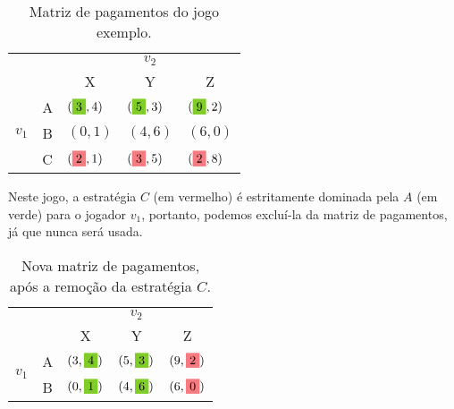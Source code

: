 \begin{table}[h]
\begin{center}
    \begin{tabular}{ccccc}
        & & \multicolumn{3}{c}{$v_2$} \\
        & & X & Y & Z \\ \cline{3-5} 
        \multirow{3}{*}{$v_1$} & \multicolumn{1}{c|}{A} & \multicolumn{1}{l|}{$(\colorbox{LimeGreen}{3},4)$} & \multicolumn{1}{l|}{$(\colorbox{LimeGreen}{5},3)$} & \multicolumn{1}{l|}{$(\colorbox{LimeGreen}{9},2)$} \\ \cline{3-5} 
        & \multicolumn{1}{c|}{B} & \multicolumn{1}{l|}{$(0,1)$}  & \multicolumn{1}{l|}{$(4,6)$} & \multicolumn{1}{l|}{$(6,0)$}  \\ \cline{3-5} 
        & \multicolumn{1}{l|}{C} & \multicolumn{1}{l|}{$(\colorbox{Salmon}{2},1)$}  & \multicolumn{1}{l|}{$(\colorbox{Salmon}{3},5)$} & \multicolumn{1}{l|}{$(\colorbox{Salmon}{2},8)$} \\ \cline{3-5} 
    \end{tabular}
    \caption{Matriz de pagamentos do jogo exemplo.}
    \label{mpjdi1}
\end{center}
\end{table}
Neste jogo, a estratégia $C$ (em vermelho) é estritamente dominada pela $A$ (em verde) para o jogador $v_1$, portanto, podemos excluí-la da matriz de pagamentos, já que nunca será usada.

\begin{table}[h]
\begin{center}
    \begin{tabular}{ccccc}
        & & \multicolumn{3}{c}{$v_2$} \\
        & & X & Y & Z \\ \cline{3-5} 
        \multirow{2}{*}{$v_1$} & \multicolumn{1}{c|}{A} & \multicolumn{1}{l|}{$(3,\colorbox{LimeGreen}{4})$} & \multicolumn{1}{l|}{$(5,\colorbox{LimeGreen}{3})$} & \multicolumn{1}{l|}{$(9,\colorbox{Salmon}{2})$} \\ \cline{3-5} 
        & \multicolumn{1}{c|}{B} & \multicolumn{1}{l|}{$(0,\colorbox{LimeGreen}{1})$}  & \multicolumn{1}{l|}{$(4,\colorbox{LimeGreen}{6})$} & \multicolumn{1}{l|}{$(6,\colorbox{Salmon}{0})$}  \\ \cline{3-5} 
    \end{tabular}
    \caption{Nova matriz de pagamentos, após a remoção da estratégia $C$.}
    \label{mpjdi2}
\end{center}
\end{table}

